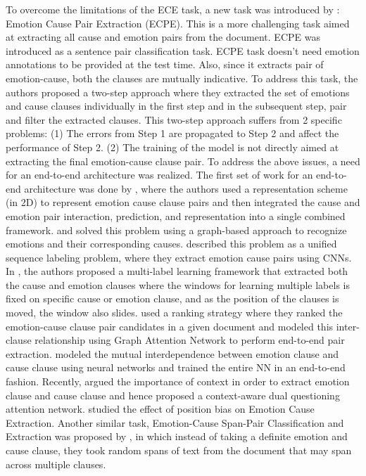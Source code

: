 \documentclass{article}
\begin{document}
To overcome the limitations of the ECE task, a new task was introduced by \citet{xia2019emotion}: Emotion Cause Pair Extraction (ECPE). This is a more challenging task aimed at  extracting all cause and emotion pairs from the document. ECPE was introduced as a sentence pair classification task. ECPE task doesn't need emotion annotations to be provided at the test time. Also, since it extracts pair of emotion-cause, both the clauses are mutually indicative. To address this task, the authors proposed a two-step approach where they extracted the set of emotions and cause clauses individually in the first step and in the subsequent step, pair and filter the extracted clauses. This two-step approach suffers from 2 specific problems: (1) The errors from Step 1 are propagated to Step 2 and affect the performance of Step 2. (2) The training of the model is not directly aimed at extracting the final emotion-cause clause pair. To address the above issues, a need for an end-to-end architecture was realized. The first set of work for an end-to-end architecture was done by \citet{ding-etal-2020-ecpe}, where the authors used a representation scheme (in 2D) to represent emotion cause clause pairs and then integrated the cause and emotion pair interaction, prediction, and representation into a single combined framework. 
\citet{song2020end} and \citet{fan2020transition} solved this problem using a graph-based approach to recognize emotions and their corresponding causes.
\citet{chen-etal-2020-unified} described this problem as a unified sequence labeling problem, where they extract emotion cause pairs using CNNs. 
In \citet{ding2020end}, the authors proposed a multi-label learning framework that extracted both the cause and emotion clauses where the windows for learning multiple labels is fixed on specific cause or emotion clause, and as the position of the clauses is moved, the window also slides.
\citet{wei-etal-2020-effective} used a ranking strategy where they ranked the emotion-cause clause pair candidates in a given document and modeled this inter-clause relationship using Graph Attention Network \cite{velivckovic2017graph} to perform end-to-end pair extraction.
\citet{singh-etal-2021-end} modeled the mutual interdependence between emotion clause and cause clause using neural networks and trained the entire NN in an end-to-end fashion. 
Recently, \citet{sun2021dual} argued the importance of context in order to extract emotion clause and cause clause and hence proposed a context-aware dual questioning attention network. \citet{ding2020experimental} studied the effect of position bias on Emotion Cause Extraction. Another similar task, Emotion-Cause Span-Pair Classification and Extraction was proposed by \citet{bi2020ecsp}, in which instead of taking a definite emotion and cause clause, they took random spans of text from the document that may span across multiple clauses.\\
\end{document}
